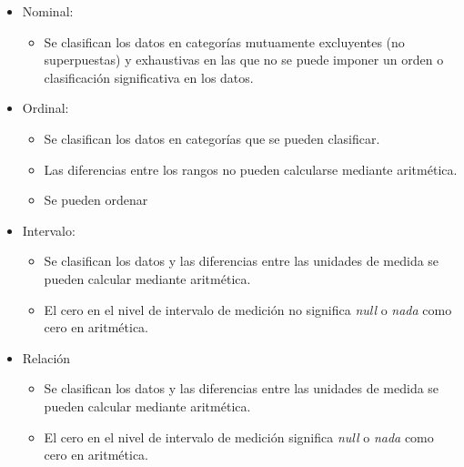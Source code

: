 \begin{itemize}
\item Nominal:
	\begin{itemize}
	\item Se clasifican los datos en categor\'ias mutuamente excluyentes (no superpuestas) y exhaustivas en las que no se puede imponer un orden o clasificaci\'on significativa en los datos. 
	\end{itemize}
		
\item Ordinal:
	\begin{itemize}
	\item Se clasifican los datos en categor\'ias que se pueden clasificar. 
	\item Las diferencias entre los rangos no pueden calcularse mediante aritm\'etica.
	\item Se pueden ordenar
	\end{itemize}		

\item Intervalo: 
	\begin{itemize}
	\item Se clasifican los datos y las diferencias entre las unidades de medida se pueden calcular mediante aritm\'etica. 
	\item El cero en el nivel de intervalo de medici\'on no significa \emph{null} o \emph{nada} como cero en aritm\'etica.
	\end{itemize}		

\item Relaci\'on
	\begin{itemize}
	\item Se clasifican los datos y las diferencias entre las unidades de medida se pueden calcular mediante aritm\'etica. 
	\item El cero en el nivel de intervalo de medici\'on significa \emph{null} o \emph{nada} como cero en aritm\'etica.
	\end{itemize}
		
\end{itemize}